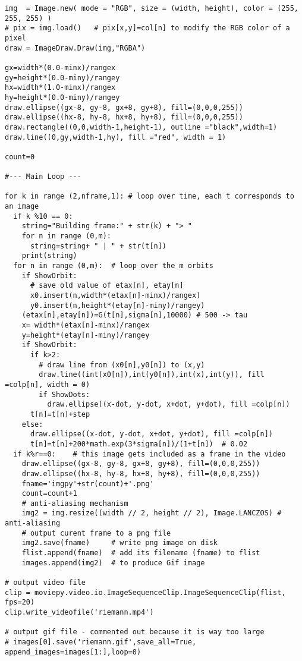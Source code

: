 \documentclass[oneside,10pt]{book}
\begin{document}
\begin{lstlisting}
img  = Image.new( mode = "RGB", size = (width, height), color = (255, 255, 255) )
# pix = img.load()   # pix[x,y]=col[n] to modify the RGB color of a pixel
draw = ImageDraw.Draw(img,"RGBA")

gx=width*(0.0-minx)/rangex
gy=height*(0.0-miny)/rangey
hx=width*(1.0-minx)/rangex
hy=height*(0.0-miny)/rangey
draw.ellipse((gx-8, gy-8, gx+8, gy+8), fill=(0,0,0,255))
draw.ellipse((hx-8, hy-8, hx+8, hy+8), fill=(0,0,0,255))
draw.rectangle((0,0,width-1,height-1), outline ="black",width=1)
draw.line((0,gy,width-1,hy), fill ="red", width = 1)

count=0

#--- Main Loop ---

for k in range (2,nframe,1): # loop over time, each t corresponds to an image
  if k %10 == 0:
    string="Building frame:" + str(k) + "> "
    for n in range (0,m):
      string=string+ " | " + str(t[n])
    print(string)
  for n in range (0,m):  # loop over the m orbits
    if ShowOrbit:
      # save old value of etax[n], etay[n]
      x0.insert(n,width*(etax[n]-minx)/rangex)
      y0.insert(n,height*(etay[n]-miny)/rangey)
    (etax[n],etay[n])=G(t[n],sigma[n],10000) # 500 -> tau
    x= width*(etax[n]-minx)/rangex
    y=height*(etay[n]-miny)/rangey
    if ShowOrbit:
      if k>2:
        # draw line from (x0[n],y0[n]) to (x,y)
        draw.line((int(x0[n]),int(y0[n]),int(x),int(y)), fill =colp[n], width = 0)
        if ShowDots:
          draw.ellipse((x-dot, y-dot, x+dot, y+dot), fill =colp[n])
      t[n]=t[n]+step
    else:
      draw.ellipse((x-dot, y-dot, x+dot, y+dot), fill =colp[n])
      t[n]=t[n]+200*math.exp(3*sigma[n])/(1+t[n])  # 0.02
  if k%r==0:    # this image gets included as a frame in the video
    draw.ellipse((gx-8, gy-8, gx+8, gy+8), fill=(0,0,0,255))
    draw.ellipse((hx-8, hy-8, hx+8, hy+8), fill=(0,0,0,255))
    fname='imgpy'+str(count)+'.png'
    count=count+1
    # anti-aliasing mechanism
    img2 = img.resize((width // 2, height // 2), Image.LANCZOS) # anti-aliasing
    # output curent frame to a png file
    img2.save(fname)     # write png image on disk
    flist.append(fname)  # add its filename (fname) to flist
    images.append(img2)  # to produce Gif image

# output video file
clip = moviepy.video.io.ImageSequenceClip.ImageSequenceClip(flist, fps=20)
clip.write_videofile('riemann.mp4')

# output gif file - commented out because it is way too large
# images[0].save('riemann.gif',save_all=True, append_images=images[1:],loop=0)
\end{lstlisting}
\end{document}
